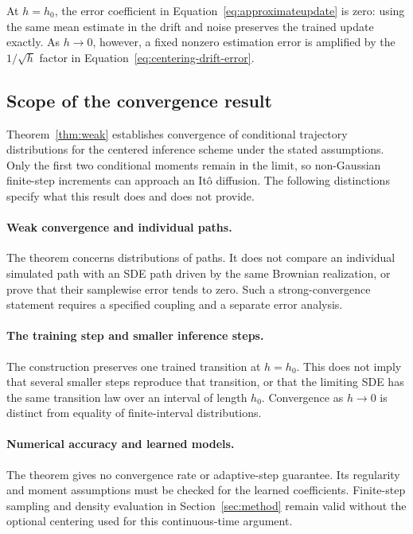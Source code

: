 At $h=h_0$, the error coefficient in Equation~\eqref{eq:approximateupdate} is zero: using the same mean estimate in the drift and noise preserves the trained update exactly. As $h\to0$, however, a fixed nonzero estimation error is amplified by the $1/\sqrt h$ factor in Equation~\eqref{eq:centering-drift-error}. 

\subsection{Scope of the convergence result}\label{sec:limit-scope}

Theorem~\ref{thm:weak} establishes convergence of conditional trajectory distributions for the centered inference scheme under the stated assumptions. Only the first two conditional moments remain in the limit, so non-Gaussian finite-step increments can approach an It\^o diffusion. The following distinctions specify what this result does and does not provide.

\paragraph{Weak convergence and individual paths.}
The theorem concerns distributions of paths. It does not compare an individual simulated path with an SDE path driven by the same Brownian realization, or prove that their samplewise error tends to zero. Such a strong-convergence statement requires a specified coupling and a separate error analysis.

\paragraph{The training step and smaller inference steps.}
The construction preserves one trained transition at $h=h_0$. This does not imply that several smaller steps reproduce that transition, or that the limiting SDE has the same transition law over an interval of length $h_0$. Convergence as $h\to0$ is distinct from equality of finite-interval distributions.

\paragraph{Numerical accuracy and learned models.}
The theorem gives no convergence rate or adaptive-step guarantee. Its regularity and moment assumptions must be checked for the learned coefficients. Finite-step sampling and density evaluation in Section~\ref{sec:method} remain valid without the optional centering used for this continuous-time argument.


